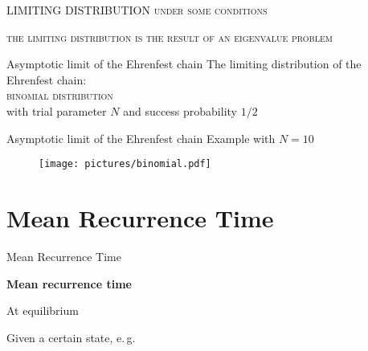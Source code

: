  \begin{frame}{LIMITING DISTRIBUTION}
    \centering
      \vspace{30pt}
      \textsc{under some conditions}

      \vspace{10pt}
      \Large
      \textsc{\alert{the limiting distribution is the result of an eigenvalue problem}}
  \end{frame}
\begin{frame}{Asymptotic limit of the Ehrenfest chain}
    \Large 
    \centering
    \vspace{20pt}
    The limiting distribution of the Ehrenfest chain:\\
    \vspace{30pt}
    \textsc{\alert{binomial distribution}}\\
    \vspace{30pt}
    \normalsize
    with trial parameter \alert{$N$} and success probability \alert{$1/2$}
  \end{frame}
  
  \begin{frame}{Asymptotic limit of the Ehrenfest chain}
    \vspace{30pt}
    Example with $N = 10$
    \begin{figure}
      \texttt{[image: pictures/binomial.pdf]}
    \end{figure}
  \end{frame}

  \section{\small{Mean Recurrence Time}}
  \begin{frame}{Mean Recurrence Time}
    \begin{center}
      \Large \textbf{Mean recurrence time}
    \end{center}
    \alert<3>{At equilibrium}

    Given a certain state, e.\,g.

    \begin{figure}
      
    \end{figure}


    \begin{figure}
    \end{figure}
    
  \end{frame}

